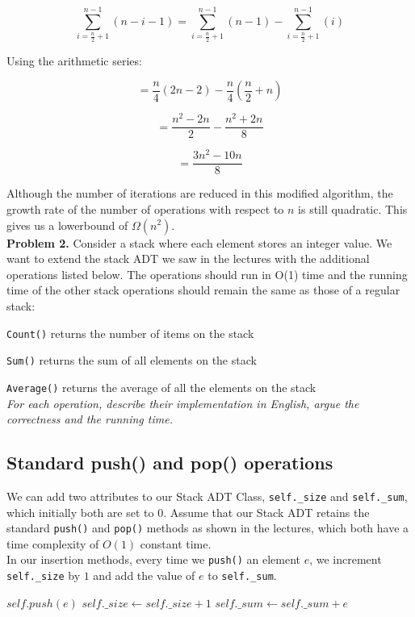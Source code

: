 \documentclass[12pt]{article}
\newcommand{\problem}[1]{\noindent \textbf{Problem #1.}}
\begin{document}
$$\sum_{i=\frac{n}{2} + 1}^{n-1} (n-i-1) = \sum_{i=\frac{n}{2} + 1}^{n-1} (n-1) - \sum_{i=\frac{n}{2} + 1}^{n-1} (i)$$

Using the arithmetic series:

$$=\frac{n}{4}(2n-2) - \frac{n}{4}(\frac{n}{2} + n)$$

$$=\frac{n^2-2n}{2} - \frac{n^2+2n}{8}$$

$$=\frac{3n^2-10n}{8}$$

Although the number of iterations are reduced in this modified algorithm, the growth rate of the number of operations with respect to $n$ is still quadratic. This gives us a lowerbound of $\Omega(n^2)$. \\ 

\newpage
\problem{2}  Consider a stack where each element stores an integer value. We want to extend the stack ADT we saw in the lectures with the additional operations listed below. The operations should run in O(1) time and the running time of the other stack operations should remain the same as those of a regular stack:

\texttt{Count()} returns the number of items on the stack

\texttt{Sum()} returns the sum of all elements on the stack

\texttt{Average()} returns the average of all the elements on the stack
\\ 

\textit{For each operation, describe their implementation in English, argue the correctness and the running time.}

\subsection*{Standard push() and pop() operations} 
We can add two attributes to our Stack ADT Class, \texttt{self.\_size} and \texttt{self.\_sum}, which initially both are set to $0$. Assume that our Stack ADT retains the standard \texttt{push()} and \texttt{pop()} methods as shown in the lectures, which both have a time complexity of $O(1)$ constant time.\\

In our insertion methods, every time we \texttt{push()} an element $e$, we increment \texttt{self.\_size} by $1$ and add the value of $e$ to \texttt{self.\_sum}. \\

\begin{algorithmic}[1]
    \State $self.push(e)$
    \State $self.\_size \gets self.\_size + 1$ 
    \State $self.\_sum \gets self.\_sum + e$ 
\EndFunction
\end{algorithmic}
\end{document}
